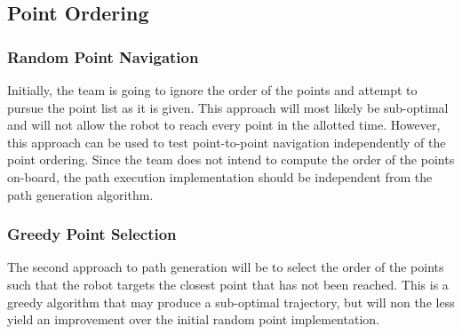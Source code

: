 \documentclass[11pt,conference,onecolumn]{article} %
\begin{document}
\subsection*{Point Ordering}
\subsubsection*{Random Point Navigation}
Initially, the team is going to ignore the order of the points and attempt to pursue the point list as it is given. This approach will most likely be sub-optimal and will not allow the robot to reach every point in the allotted time. However, this approach can be used to test point-to-point navigation independently of the point ordering. Since the team does not intend to compute the order of the points on-board, the path execution implementation should be independent from the path generation algorithm.
\subsubsection*{Greedy Point Selection}
The second approach to path generation will be to select the order of the points such that the robot targets the closest point that has not been reached. This is a greedy algorithm that may produce a sub-optimal trajectory, but will non the less yield an improvement over the initial random point implementation.
\end{document}
